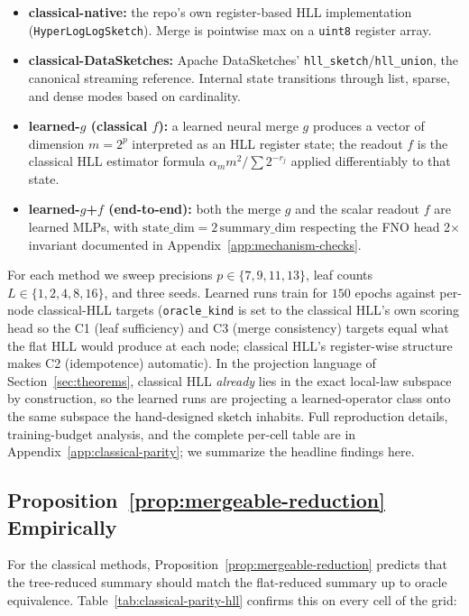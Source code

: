 \begin{itemize}[leftmargin=1.5em]
    \item \textbf{classical-native:} the repo's own register-based HLL
          implementation (\texttt{HyperLogLogSketch}). Merge is pointwise
          max on a \texttt{uint8} register array.
    \item \textbf{classical-DataSketches:} Apache DataSketches'
          \texttt{hll\_sketch}/\texttt{hll\_union}, the canonical streaming
          reference. Internal state transitions through list, sparse, and
          dense modes based on cardinality.
    \item \textbf{learned-$g$ (classical $f$):} a learned neural merge
          $g$ produces a vector of dimension $m = 2^p$ interpreted as an
          HLL register state; the readout $f$ is the classical HLL
          estimator formula $\alpha_m m^2 / \sum 2^{-r_j}$ applied
          differentiably to that state.
    \item \textbf{learned-$g$+$f$ (end-to-end):} both the merge $g$ and
          the scalar readout $f$ are learned MLPs, with
          $\text{state\_dim} = 2\,\text{summary\_dim}$ respecting the
          FNO head 2$\times$ invariant documented in
          Appendix~\ref{app:mechanism-checks}.
\end{itemize}

For each method we sweep precisions $p \in \{7, 9, 11, 13\}$, leaf counts
$L \in \{1, 2, 4, 8, 16\}$, and three seeds. Learned runs train for $150$
epochs against per-node classical-HLL targets (\texttt{oracle\_kind} is
set to the classical HLL's own scoring head so the C1 (leaf sufficiency)
and C3 (merge consistency) targets equal what the flat HLL would produce
at each node; classical HLL's register-wise structure makes C2
(idempotence) automatic). In the projection language of
Section~\ref{sec:theorems}, classical HLL \emph{already} lies in the
exact local-law subspace by construction, so the learned runs are
projecting a learned-operator class onto the same subspace the
hand-designed sketch inhabits. Full reproduction details,
training-budget analysis, and the complete per-cell table are in
Appendix~\ref{app:classical-parity}; we summarize the headline findings
here.

\subsection{Proposition~\ref{prop:mergeable-reduction} Empirically}

For the classical methods, Proposition~\ref{prop:mergeable-reduction}
predicts that the tree-reduced summary should match the flat-reduced
summary up to oracle equivalence. Table~\ref{tab:classical-parity-hll}
confirms this on every cell of the grid:

